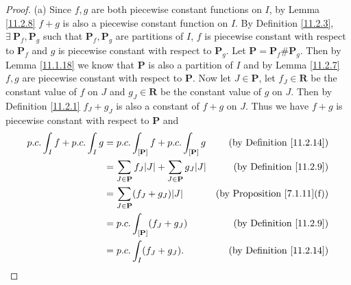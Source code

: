 \begin{proof}{(a)}
    Since \(f, g\) are both piecewise constant functions on \(I\), by Lemma \ref{11.2.8} \(f + g\) is also a piecewise constant function on \(I\).
    By Definition \ref{11.2.3}, \(\exists\ \mathbf{P}_f, \mathbf{P}_g\) such that \(\mathbf{P}_f, \mathbf{P}_g\) are partitions of \(I\), \(f\) is piecewise constant with respect to \(\mathbf{P}_f\) and \(g\) is piecewise constant with respect to \(\mathbf{P}_g\).
    Let \(\mathbf{P} = \mathbf{P}_f \# \mathbf{P}_g\).
    Then by Lemma \ref{11.1.18} we know that \(\mathbf{P}\) is also a partition of \(I\) and by Lemma \ref{11.2.7} \(f, g\) are piecewise constant with respect to \(\mathbf{P}\).
    Now let \(J \in \mathbf{P}\), let \(f_J \in \mathbf{R}\) be the constant value of \(f\) on \(J\) and \(g_J \in \mathbf{R}\) be the constant value of \(g\) on \(J\).
    Then by Definition \ref{11.2.1} \(f_J + g_J\) is also a constant of \(f + g\) on \(J\).
    Thus we have \(f + g\) is piecewise constant with respect to \(\mathbf{P}\) and
    \begin{align*}
        p.c. \int_I f + p.c. \int_I g & = p.c. \int_{[\mathbf{P}]} f + p.c. \int_{[\mathbf{P}]} g                     & \text{(by Definition \ref{11.2.14})}    \\
                                      & = \sum_{J \in \mathbf{P}} f_J \abs*{J} + \sum_{J \in \mathbf{P}} g_J \abs*{J} & \text{(by Definition \ref{11.2.9})}     \\
                                      & = \sum_{J \in \mathbf{P}} (f_J + g_J) \abs*{J}                                & \text{(by Proposition \ref{7.1.11}(f))} \\
                                      & = p.c. \int_{[\mathbf{P}]} (f_J + g_J)                                        & \text{(by Definition \ref{11.2.9})}     \\
                                      & = p.c. \int_I (f_J + g_J).                                                    & \text{(by Definition \ref{11.2.14})}
    \end{align*}
\end{proof}

